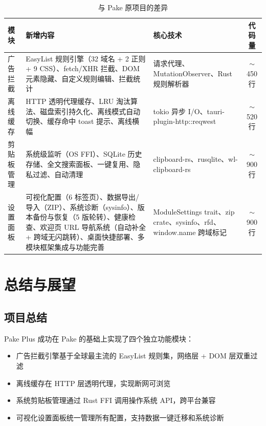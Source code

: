 \documentclass[12pt,a4paper]{ctexart}
\begin{document}
\begin{table}[H]
\centering
\small
\begin{tabularx}{\textwidth}{lXXc}
\toprule
模块 & 新增内容 & 核心技术 & 代码量 \\
\midrule
广告拦截   & EasyList 规则引擎（32 域名 + 2 正则 + 9 CSS）、fetch/XHR 拦截、DOM 元素隐藏、自定义规则编辑、拦截统计 & 请求代理、MutationObserver、Rust 规则解析器 & $\sim$450 行 \\
离线缓存   & HTTP 透明代理缓存、LRU 淘汰算法、磁盘索引持久化、离线模式自动切换、缓存命中 toast 提示、离线横幅 & tokio 异步 I/O、tauri-plugin-http::reqwest & $\sim$520 行 \\
剪贴板管理 & 系统级监听（OS FFI）、SQLite 历史存储、全文搜索面板、一键复用、隐私过滤、自动清理 & clipboard-rs、rusqlite、wl-clipboard-rs & $\sim$900 行 \\
设置面板   & 可视化配置（6 标签页）、数据导出/导入（ZIP）、系统诊断（sysinfo）、版本备份与恢复（5 版轮转）、健康检查、欢迎页 URL 导航系统（自动补全 + 跨域无闪跳转）、桌面快捷部署、多模块框架集成与功能完善 & ModuleSettings trait、zip crate、sysinfo、rfd、window.name 跨域标记 & $\sim$900 行 \\
\bottomrule
\end{tabularx}
\caption{与 Pake 原项目的差异}
\end{table}

\section{总结与展望}

\subsection{项目总结}

Pake Plus 成功在 Pake 的基础上实现了四个独立功能模块：

\begin{itemize}
  \item 广告拦截引擎基于全球最主流的 EasyList 规则集，网络层 + DOM 层双重过滤
  \item 离线缓存在 HTTP 层透明代理，实现断网可浏览
  \item 系统剪贴板管理通过 Rust FFI 调用操作系统 API，跨平台兼容
  \item 可视化设置面板统一管理所有配置，支持数据一键迁移和系统诊断
\end{itemize}
\end{document}
